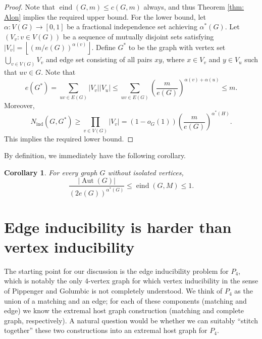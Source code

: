 \documentclass[reqno,11pt]{amsart}
\numberwithin{equation}{section}
\newtheorem{corollary}[theorem]{Corollary}
\theoremstyle{definition}
\theoremstyle{remark}
\newcommand{\abs}[1]{\left\lvert#1\right\rvert}
\DeclareMathOperator{\ind}{ind}
\DeclareMathOperator{\eind}{eind}
\DeclareMathOperator{\Aut}{Aut}
\begin{document}
\begin{proof}
    Note that $\eind(G,m)\leq c(G,m)$ always, and thus Theorem \ref{thm: Alon} implies the required upper bound.
    For the lower bound, let $\alpha\colon V(G) \to [0,1]$ be a fractional independence set achieving $\alpha^*(G)$. Let $(V_v:v\in V(G))$ be a sequence of mutually disjoint sets satisfying $\abs{V_v}= \left\lfloor\left({m}/{e(G)}\right)^{\alpha(v)}\right\rfloor$. Define $G^*$ to be the graph with vertex set $\bigcup_{v\in V(G)} V_v$ and edge set consisting of all pairs $xy$, where $x\in V_v$ and $y\in V_u$ such that $uv\in G$. Note that 
    \[
        e(G^*) = \sum_{uv\in E(G)} \abs{V_v}\abs{V_u} \le \sum_{uv\in E(G)} \left(\frac{m}{e(G)}\right)^{\alpha(v)+\alpha(u)} \leq m.
    \]
    Moreover, 
    \[
        N_{\ind}(G,G^*) \geq \prod_{v\in V(G)} \abs{V_v} =(1-o_G(1))  \left(\frac{m}{e(G)}\right)^{\alpha^*(H)}.
    \]
    This implies the required lower bound.
\end{proof}

By definition, we immediately have the following corollary.

\begin{corollary}\label{cor:simple bound}
    For every graph $G$ without isolated vertices,
    \[\frac{\abs{\Aut(G)}}{(2e(G))^{\alpha^*(G)}}\leq \eind(G,M)\leq 1.\]
\end{corollary}

\section{Edge inducibility is harder than vertex inducibility}\label{sec: edge ind is hard}

The starting point for our discussion is the edge inducibility problem for $P_4$, which is notably the only 4-vertex graph for which vertex inducibility in the sense of Pippenger and Golumbic \cite{PipGol1975} is not completely understood. We think of $P_4$ as the union of a matching and an edge; for each of these components (matching and edge) we know the extremal host graph construction (matching and complete graph, respectively). A natural question would be whether we can suitably ``stitch together'' these two constructions into an extremal host graph for $P_4$. 
\end{document}
